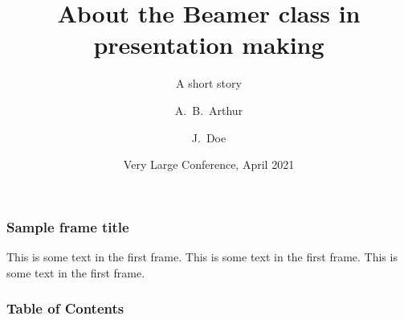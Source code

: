 \documentclass{beamer}
\title[About Beamer] %
{About the Beamer class in presentation making}
\subtitle{A short story}
\author[Arthur, Doe] %
{A.~B.~Arthur\inst{1} \and J.~Doe\inst{2}}
\institute[VFU] %
{
	\inst{1}%
	Faculty of Physics\\
	Very Famous University
	\and
	\inst{2}%
	Faculty of Chemistry\\
	Very Famous University
}
\date[VLC 2021] %
{Very Large Conference, April 2021}
\begin{document}
	
	\frame{\titlepage}
	
	\begin{frame}
		\frametitle{Sample frame title}
		This is some text in the first frame. This is some text in the first frame. This is some text in the first frame.
	\end{frame}
	
	\begin{frame}
		\frametitle{Table of Contents}
		\tableofcontents
	\end{frame}
	
\end{document}

